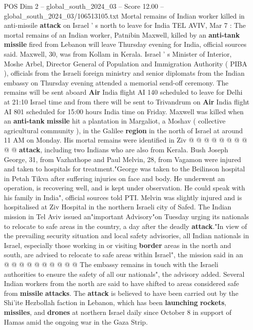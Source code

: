 \begin{textsample}{POS Dim 2 – global\_south\_2024\_03 – Score 12.00 – global\_south\_2024\_03/106513105.txt}  \label{ex:f2_pos_340}
Mortal remains of Indian worker killed in anti-missile \textbf{attack} on Israel ' s north to leave for India TEL AVIV, Mar 7 : The mortal remains of an Indian worker, Patnibin Maxwell, killed by an \textbf{anti-tank} \textbf{missile} fired from Lebanon will leave Thursday evening for India, official sources said.
Maxwell, 30, was from Kollam in Kerala.
Israel ' s Minister of Interior, Moshe Arbel, Director General of Population and Immigration Authority ( PIBA ), officials from the Israeli foreign ministry and senior diplomats from the Indian embassy on Thursday evening attended a memorial send-off ceremony.
The remains will be sent aboard \textbf{Air} India flight AI 140 scheduled to leave for Delhi at 21:10 Israel time and from there will be sent to Trivandrum on \textbf{Air} India flight AI 801 scheduled for 15:00 hours India time on Friday.
Maxwell was killed when an \textbf{anti-tank} \textbf{missile} hit a plantation in Margaliot, a Moshav ( collective agricultural community ), in the Galilee \textbf{region} in the north of Israel at around 11 AM on Monday.
His mortal remains were identified in Ziv @ @ @ @ @ @ @ @ @ @ \textbf{attack}, including two Indians who are also from Kerala.
Bush Joseph George, 31, from Vazhathope and Paul Melvin, 28, from Vagamon were injured and taken to hospitals for treatment."George was taken to the Beilinson hospital in Petah Tikva after suffering injuries on face and body.
He underwent an operation, is recovering well, and is kept under observation.
He could speak with his family in India", official sources told PTI.
Melvin was slightly injured and is hospitalised at Ziv Hospital in the northern Israeli city of Safed.
The Indian mission in Tel Aviv issued an"important Advisory"on Tuesday urging its nationals to relocate to safe areas in the country, a day after the deadly \textbf{attack}."In view of the prevailing security situation and local safety advisories, all Indian nationals in Israel, especially those working in or visiting \textbf{border} areas in the north and south, are advised to relocate to safe areas within Israel", the mission said in an @ @ @ @ @ @ @ @ @ @ The embassy remains in touch with the Israeli authorities to ensure the safety of all our nationals", the advisory added.
Several Indian workers from the north are said to have shifted to areas considered safe from \textbf{missile} \textbf{attacks}.
The \textbf{attack} is believed to have been carried out by the Shi'ite Hezbollah faction in Lebanon, which has been \textbf{launching} \textbf{rockets}, \textbf{missiles}, and \textbf{drones} at northern Israel daily since October 8 in support of Hamas amid the ongoing war in the Gaza Strip.

\end{textsample}
